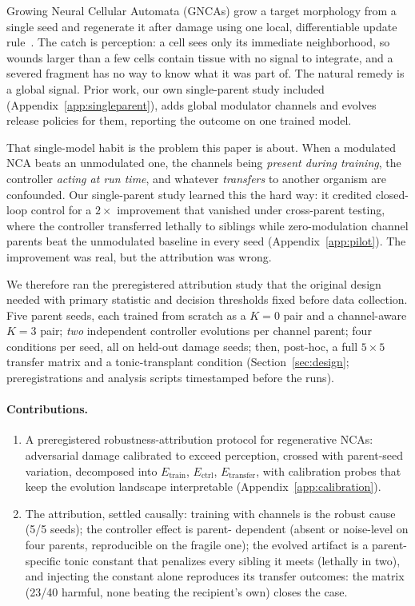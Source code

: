 \documentclass{article}
\begin{document}
Growing Neural Cellular Automata (GNCAs) grow a target morphology from a
single seed and regenerate it after damage using one local, differentiable
update rule~\cite{mordvintsev2020gnca}. The catch is perception: a cell
sees only its immediate neighborhood, so wounds larger than a few cells
contain tissue with no signal to integrate, and a severed fragment has no
way to know what it was part of. The natural remedy is a global signal.
Prior work, our own single-parent study included
(Appendix~\ref{app:singleparent}), adds global modulator channels and
evolves release policies for them, reporting the outcome on one
trained model.

That single-model habit is the problem this paper is about. When a
modulated NCA beats an unmodulated one, the channels being \emph{present
during training}, the controller \emph{acting at run time}, and whatever
\emph{transfers} to another organism are confounded. Our single-parent
study learned this the hard way: it credited closed-loop control for a
$2\times$ improvement that vanished under cross-parent testing, where
the controller transferred lethally to siblings while zero-modulation
channel parents beat the unmodulated baseline in every seed
(Appendix~\ref{app:pilot}). The improvement was real, but the attribution
was wrong.

We therefore ran the preregistered attribution study that the original
design needed with primary statistic and decision thresholds fixed
before data collection. Five parent seeds, each trained from scratch as
a $K{=}0$ pair and a channel-aware $K{=}3$ pair; \emph{two} independent
controller evolutions per channel parent; four conditions per seed, all
on held-out damage seeds; then, post-hoc, a full $5{\times}5$ transfer
matrix and a tonic-transplant condition (Section~\ref{sec:design};
preregistrations and analysis scripts timestamped before the runs).

\paragraph{Contributions.}
\begin{enumerate}
\item A preregistered robustness-attribution protocol for regenerative
NCAs: adversarial damage calibrated to exceed perception, crossed
with parent-seed variation, decomposed into
$E_{\mathrm{train}}$, $E_{\mathrm{ctrl}}$, $E_{\mathrm{transfer}}$,
with calibration probes that keep the evolution landscape
interpretable (Appendix~\ref{app:calibration}).
\item The attribution, settled causally: training with channels is the
robust cause (5/5 seeds); the controller effect is parent-
dependent (absent or noise-level on four parents, reproducible on
the fragile one); the evolved artifact is a parent-specific tonic
constant that penalizes every sibling it meets (lethally in two),
and injecting the constant alone reproduces its transfer
outcomes: the matrix (23/40 harmful, none beating the
recipient's own) closes the case.
\end{enumerate}
\end{document}
